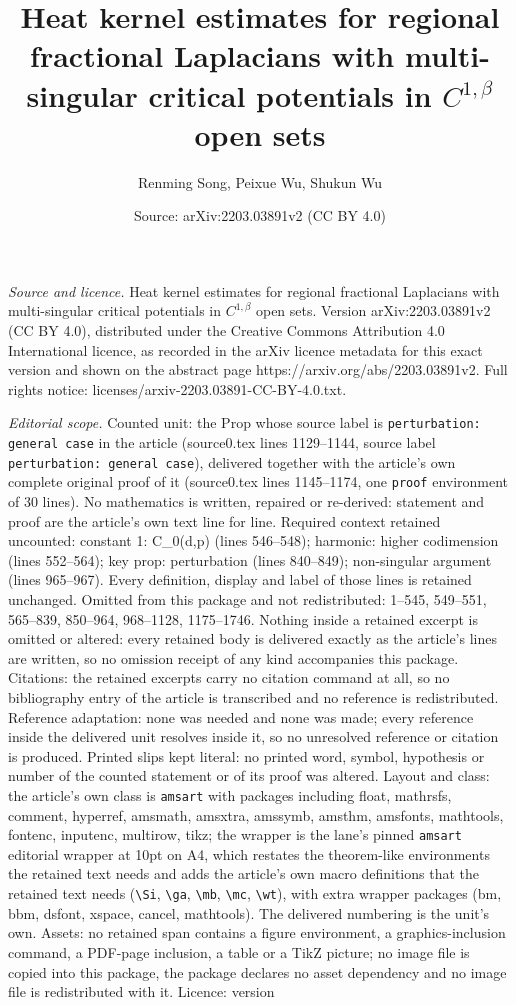 \documentclass[10pt,a4paper]{amsart}
\title[Heat kernel estimates for regional fractional Laplacians wit]{Heat kernel estimates for regional fractional Laplacians with multi-singular critical potentials in $C^{1, \beta}$ open sets}
\author{Renming Song, Peixue Wu, Shukun Wu}
\date{Source: arXiv:2203.03891v2 (CC BY 4.0)}
\begin{document}
\maketitle

\noindent\emph{Source and licence.} Heat kernel estimates for regional fractional Laplacians with multi-singular critical potentials in $C^{1, \beta}$ open sets. Version arXiv:2203.03891v2 (CC BY 4.0), distributed under the Creative Commons Attribution 4.0 International licence, as recorded in the arXiv licence metadata for this exact version and shown on the abstract page https://arxiv.org/abs/2203.03891v2. Full rights notice: licenses/arxiv-2203.03891-CC-BY-4.0.txt.\par\smallskip

\noindent\textit{Editorial scope.} Counted unit: the Prop whose source label is \texttt{perturbation: general case} in the article (source0.tex lines 1129--1144, source label \texttt{perturbation: general case}), delivered together with the article's own complete original proof of it (source0.tex lines 1145--1174, one \texttt{proof} environment of 30 lines). No mathematics is written, repaired or re-derived: statement and proof are the article's own text line for line. Required context retained uncounted: constant 1: C\_0(d,p) (lines 546--548); harmonic: higher codimension (lines 552--564); key prop: perturbation (lines 840--849); non-singular argument (lines 965--967). Every definition, display and label of those lines is retained unchanged. Omitted from this package and not redistributed: 1--545, 549--551, 565--839, 850--964, 968--1128, 1175--1746. Nothing inside a retained excerpt is omitted or altered: every retained body is delivered exactly as the article's lines are written, so no omission receipt of any kind accompanies this package. Citations: the retained excerpts carry no citation command at all, so no bibliography entry of the article is transcribed and no reference is redistributed. Reference adaptation: none was needed and none was made; every reference inside the delivered unit resolves inside it, so no unresolved reference or citation is produced. Printed slips kept literal: no printed word, symbol, hypothesis or number of the counted statement or of its proof was altered. Layout and class: the article's own class is \texttt{amsart} with packages including float, mathrsfs, comment, hyperref, amsmath, amsxtra, amssymb, amsthm, amsfonts, mathtools, fontenc, inputenc, multirow, tikz; the wrapper is the lane's pinned \texttt{amsart} editorial wrapper at 10pt on A4, which restates the theorem-like environments the retained text needs and adds the article's own macro definitions that the retained text needs (\texttt{\textbackslash Si}, \texttt{\textbackslash ga}, \texttt{\textbackslash mb}, \texttt{\textbackslash mc}, \texttt{\textbackslash wt}), with extra wrapper packages (bm, bbm, dsfont, xspace, cancel, mathtools). The delivered numbering is the unit's own. Assets: no retained span contains a figure environment, a graphics-inclusion command, a PDF-page inclusion, a table or a TikZ picture; no image file is copied into this package, the package declares no asset dependency and no image file is redistributed with it. Licence: version 
\end{document}
